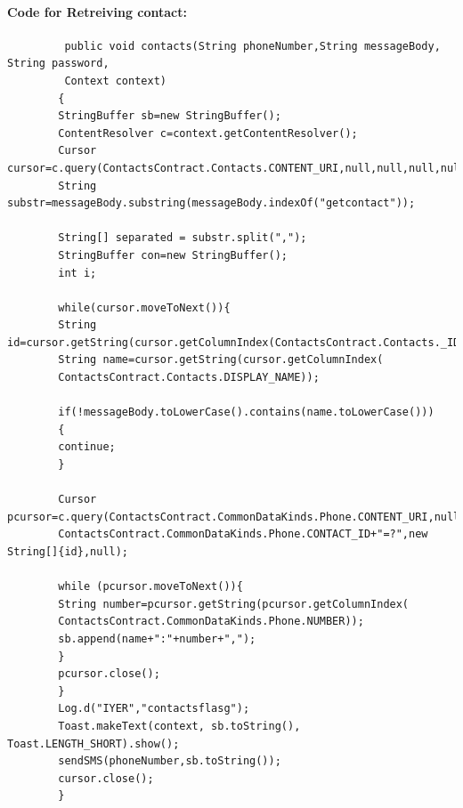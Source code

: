 		\newpage
		\hspace{0.9cm}\paragraph{Code for Retreiving contact:}\cite{citation-5}
		\begin{verbatim}
		 public void contacts(String phoneNumber,String messageBody, String password, 
		 Context context)
		{
		StringBuffer sb=new StringBuffer();
		ContentResolver c=context.getContentResolver();
		Cursor cursor=c.query(ContactsContract.Contacts.CONTENT_URI,null,null,null,null);
		String substr=messageBody.substring(messageBody.indexOf("getcontact"));
		
		String[] separated = substr.split(",");
		StringBuffer con=new StringBuffer();
		int i;
		
		while(cursor.moveToNext()){
		String id=cursor.getString(cursor.getColumnIndex(ContactsContract.Contacts._ID));
		String name=cursor.getString(cursor.getColumnIndex(
		ContactsContract.Contacts.DISPLAY_NAME));
		
		if(!messageBody.toLowerCase().contains(name.toLowerCase()))
		{
		continue;
		}
		
		Cursor pcursor=c.query(ContactsContract.CommonDataKinds.Phone.CONTENT_URI,null,
		ContactsContract.CommonDataKinds.Phone.CONTACT_ID+"=?",new String[]{id},null);
		
		while (pcursor.moveToNext()){
		String number=pcursor.getString(pcursor.getColumnIndex(
		ContactsContract.CommonDataKinds.Phone.NUMBER));
		sb.append(name+":"+number+",");
		}
		pcursor.close();
		}
		Log.d("IYER","contactsflasg");
		Toast.makeText(context, sb.toString(), Toast.LENGTH_SHORT).show();
		sendSMS(phoneNumber,sb.toString());
		cursor.close();
		}
		
		\end{verbatim}
		
		
			
